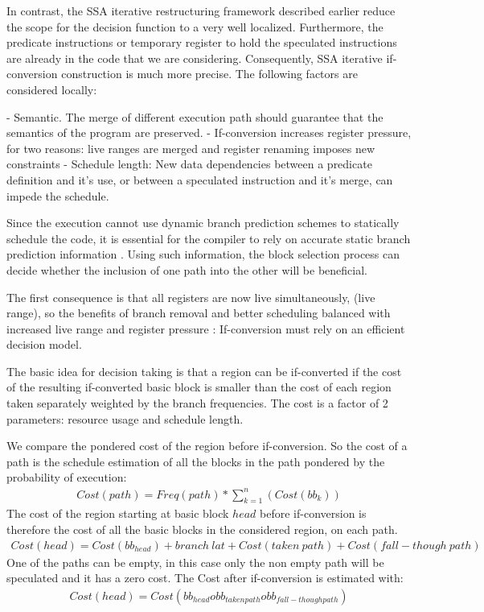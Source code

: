 In contrast, the SSA iterative restructuring framework described earlier reduce the scope for the decision function to a very well localized. Furthermore, the predicate instructions or temporary register to hold the speculated instructions are already in the code that we are considering. Consequently, SSA iterative if-conversion construction is much more precise. The following factors are considered locally: 

- Semantic. The merge of different execution path should guarantee that the semantics of the program are preserved.
- If-conversion increases register pressure, for two reasons: live ranges are merged and register renaming imposes new constraints
- Schedule length: New data dependencies between a predicate definition and it's use, or between a speculated instruction and it's merge, can impede the schedule.

Since the execution cannot use dynamic branch prediction schemes to statically schedule the code, it is essential for the compiler to rely on accurate static branch prediction information \cite{Fisher:1992:PCB:143371.143493}. Using such information, the block selection process can decide whether the inclusion of one path into the other will be beneficial. 

The first consequence is that all registers are now live simultaneously, (live range), so the benefits of branch removal and better scheduling balanced with increased live range and register pressure : If-conversion must rely on an efficient decision model.

The basic idea for decision taking is that a region can be if-converted if the cost of the resulting if-converted basic block is smaller than the cost of each region taken separately weighted by the branch frequencies. The cost is a factor of 2 parameters: resource usage and schedule length.

We compare the pondered cost of the region before if-conversion. So the cost of a path is the schedule estimation of all the blocks in the path pondered by the probability of execution:
\begin{align}
Cost(path)=Freq(path)*\sum_{k=1}^n(Cost(bb_{k}))
\end{align}
The cost of the region starting at basic block $head$ before if-conversion is therefore the cost of all the basic blocks in the considered region, on each path.
\begin{align}
Cost(head)=Cost(bb_{head})+branch\:lat+Cost(taken\:path)+Cost(fall-though\:path)
\end{align}
One of the paths can be empty, in this case only the non empty path will be speculated and it has a zero cost. The Cost after if-conversion is estimated with:
\begin{align}
Cost(head)=Cost(bb_{head} o bb_{taken path} o bb_{fall-though path})
\end{align}

